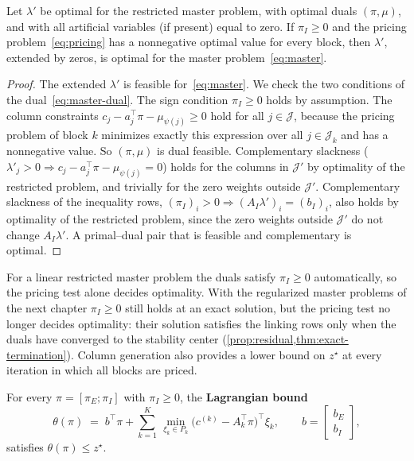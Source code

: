 \begin{prop} \label{prop:cg-optimality}
Let $\lambda'$ be optimal for the restricted master problem, with optimal duals
$(\pi,\mu)$, and with all artificial variables (if present) equal to zero. If $\pi_I\ge0$ and the pricing problem~\eqref{eq:pricing} has a nonnegative
optimal value for every block, then $\lambda'$, extended by zeros, is optimal for the master
problem~\eqref{eq:master}.
\end{prop}

\begin{proof}
The extended $\lambda'$ is feasible for~\eqref{eq:master}. We check the two conditions of the
dual~\eqref{eq:master-dual}. The sign condition $\pi_I\ge0$ holds by assumption. The column
constraints $c_j - a_j^\top\pi - \mu_{\psi(j)}\ge0$ hold for all $j\in\mathcal{J}$, because the
pricing problem of block $k$ minimizes exactly this expression over all $j\in\mathcal{J}_k$
and has a nonnegative value. So $(\pi,\mu)$ is dual feasible. Complementary slackness
($\lambda'_j>0\Rightarrow c_j - a_j^\top\pi - \mu_{\psi(j)} = 0$) holds for the columns in
$\mathcal{J}'$ by optimality of the restricted problem, and trivially for the zero weights
outside $\mathcal{J}'$. Complementary slackness of the inequality rows,
$(\pi_I)_i>0\Rightarrow(A_I\lambda')_i = (b_I)_i$, also holds by optimality of the restricted
problem, since the zero weights outside $\mathcal{J}'$ do not change $A_I\lambda'$. A
primal--dual pair that is feasible and complementary is optimal.
\end{proof}

For a linear restricted master problem the duals satisfy $\pi_I\ge0$ automatically, so the
pricing test alone decides optimality. With the regularized master problems of the next
chapter $\pi_I\ge0$ still holds at an exact solution, but the pricing test no longer decides
optimality: their solution satisfies the linking rows only when the duals have converged to the
stability center (\cref{prop:residual,thm:exact-termination}). Column generation also provides a lower bound on
$z^\star$ at every iteration in which all blocks are priced.

\begin{prop} \label{prop:lagrangian-bound}
For every $\pi = [\pi_E;\pi_I]$ with $\pi_I\ge0$, the \textbf{Lagrangian bound}
\[
\theta(\pi) \;=\; b^\top\pi + \sum_{k=1}^{K}\,\min_{\xi_k\in P_k}\bigl(c^{(k)} - A_k^\top\pi\bigr)^\top \xi_k,
\qquad b = \begin{bmatrix}b_E\\ b_I\end{bmatrix},
\]
satisfies $\theta(\pi)\le z^\star$.
\end{prop}


